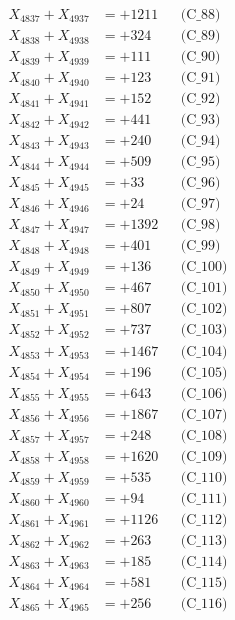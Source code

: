 \documentclass[a4paper,10pt]{article}
\begin{document}
{\begin{align}
X_{4837} + X_{4937} &= +1211 && \text{(C\_88)} \\
X_{4838} + X_{4938} &= +324 && \text{(C\_89)} \\
X_{4839} + X_{4939} &= +111 && \text{(C\_90)} \\
\allowbreak
X_{4840} + X_{4940} &= +123 && \text{(C\_91)} \\
X_{4841} + X_{4941} &= +152 && \text{(C\_92)} \\
X_{4842} + X_{4942} &= +441 && \text{(C\_93)} \\
X_{4843} + X_{4943} &= +240 && \text{(C\_94)} \\
X_{4844} + X_{4944} &= +509 && \text{(C\_95)} \\
\allowbreak
X_{4845} + X_{4945} &= +33 && \text{(C\_96)} \\
X_{4846} + X_{4946} &= +24 && \text{(C\_97)} \\
X_{4847} + X_{4947} &= +1392 && \text{(C\_98)} \\
X_{4848} + X_{4948} &= +401 && \text{(C\_99)} \\
X_{4849} + X_{4949} &= +136 && \text{(C\_100)} \\
\allowbreak
X_{4850} + X_{4950} &= +467 && \text{(C\_101)} \\
X_{4851} + X_{4951} &= +807 && \text{(C\_102)} \\
X_{4852} + X_{4952} &= +737 && \text{(C\_103)} \\
X_{4853} + X_{4953} &= +1467 && \text{(C\_104)} \\
X_{4854} + X_{4954} &= +196 && \text{(C\_105)} \\
\allowbreak
X_{4855} + X_{4955} &= +643 && \text{(C\_106)} \\
X_{4856} + X_{4956} &= +1867 && \text{(C\_107)} \\
X_{4857} + X_{4957} &= +248 && \text{(C\_108)} \\
X_{4858} + X_{4958} &= +1620 && \text{(C\_109)} \\
X_{4859} + X_{4959} &= +535 && \text{(C\_110)} \\
\allowbreak
X_{4860} + X_{4960} &= +94 && \text{(C\_111)} \\
X_{4861} + X_{4961} &= +1126 && \text{(C\_112)} \\
X_{4862} + X_{4962} &= +263 && \text{(C\_113)} \\
X_{4863} + X_{4963} &= +185 && \text{(C\_114)} \\
X_{4864} + X_{4964} &= +581 && \text{(C\_115)} \\
\allowbreak
X_{4865} + X_{4965} &= +256 && \text{(C\_116)} \\

\end{align}}
\end{document}
